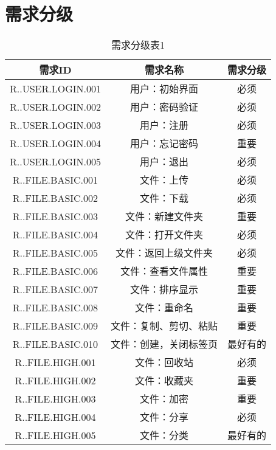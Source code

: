 \chapter{需求分级}
\begin{table}[htbp]
\centering
\caption{需求分级表1} \label{tab:abbr}
\begin{tabular}{|c|c|c|}
    \hline
    需求ID & 需求名称 & 需求分级 \\
    \hline
    R..USER.LOGIN.001 & 用户：初始界面 & 必须 \\
    \hline
    R..USER.LOGIN.002 & 用户：密码验证 & 必须 \\
    \hline 
    R..USER.LOGIN.003 & 用户：注册 & 必须 \\
    \hline
    R..USER.LOGIN.004 & 用户：忘记密码 & 重要 \\
    \hline
    R..USER.LOGIN.005 & 用户：退出 & 必须 \\
    \hline
    R..FILE.BASIC.001 & 文件：上传 & 必须 \\
    \hline
    R..FILE.BASIC.002 & 文件：下载 & 必须 \\
    \hline 
    R..FILE.BASIC.003 & 文件：新建文件夹 & 重要 \\
    \hline
    R..FILE.BASIC.004 & 文件：打开文件夹 & 必须 \\
    \hline
    R..FILE.BASIC.005 & 文件：返回上级文件夹 & 必须 \\
    \hline
    R..FILE.BASIC.006 & 文件：查看文件属性 & 重要 \\
    \hline
    R..FILE.BASIC.007 & 文件：排序显示 & 重要 \\
    \hline
    R..FILE.BASIC.008 & 文件：重命名 & 重要 \\
    \hline
    R..FILE.BASIC.009 & 文件：复制、剪切、粘贴 & 重要 \\
    \hline
    R..FILE.BASIC.010 & 文件：创建，关闭标签页 & 最好有的 \\
    \hline
    R..FILE.HIGH.001 & 文件：回收站 & 必须 \\
    \hline
    R..FILE.HIGH.002 & 文件：收藏夹 & 重要 \\
    \hline
    R..FILE.HIGH.003 & 文件：加密 & 重要 \\
    \hline
    R..FILE.HIGH.004 & 文件：分享 & 必须 \\
    \hline
    R..FILE.HIGH.005 & 文件：分类 & 最好有的 \\
    \hline 
\end{tabular}
\end{table}
